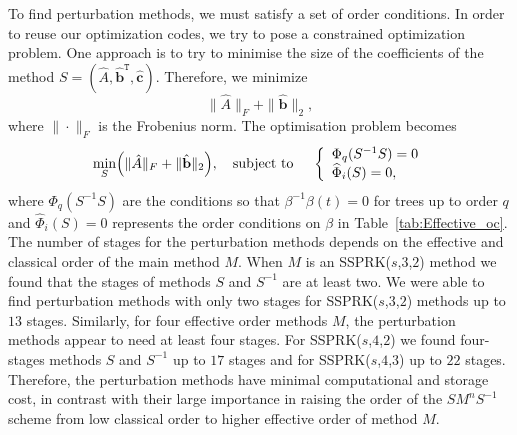 To find perturbation methods, we must satisfy a set of order conditions.  In order to reuse our optimization codes, we try to pose a constrained optimization problem.  One approach %
 is to try to minimise the size of the coefficients of the method \( S  = (\hat{A}, \hat{\textbf{b}}^{\texttt{T}}, \hat{\textbf{c}}) \). Therefore, we minimize
\begin{displaymath}
    \|\hat{A}\|_{F} + \|\hat{\textbf{b}}\|_{2},
\end{displaymath}
where \( \|\cdot\|_{F} \) is the Frobenius norm. The optimisation problem becomes
\begin{equation}\label{eq5.2}
    \min_{S} \Bigl(\|\hat{A}\|_{F} + \|\hat{\textbf{b}}\|_{2}\Bigr), \quad \text{subject to } \quad \left\{
                                                                                     \begin{array}{ll}
                                                                                           \Phi_{q}(S^{-1}S) = 0 \\
                                                                                           \widehat{\Phi}_{i}(S) = 0,
                                                                                     \end{array}
                                                                             \right.
\end{equation}
where \( \Phi_{q}(S^{-1}S) \) are the conditions
so that \( \beta^{-1}\beta(t) = 0 \) for trees up to order \( q \)
 and \( \widehat{\Phi}_{i}(S) = 0 \) represents the order conditions on \( \beta \) in Table~\ref{tab:Effective_oc}.
The number of stages for the perturbation methods depends on the effective and classical order of the main method \( M \). When \( M \) is an SSPRK(\( s \),\( 3 \),\( 2 \)) method we found that the stages of methods \( S \) and \( S^{-1} \) are at least two. We were able to find perturbation methods with only two stages for SSPRK(\( s \),\( 3 \),\( 2 \)) methods up to \( 13 \) stages. Similarly, for four effective order methods \( M \), the perturbation methods appear to need at least four stages. For SSPRK(\( s \),\( 4 \),\( 2 \)) we found four-stages methods \( S \) and \( S^{-1} \) up to \( 17 \) stages and for SSPRK(\( s \),\( 4 \),\( 3 \)) up to \( 22 \) stages. Therefore, the perturbation methods have minimal computational and storage cost, in contrast with their large importance in raising the order of the \( SM^{n}S^{-1} \) scheme from low classical order to higher effective order of method \( M \).

